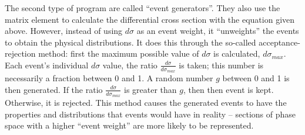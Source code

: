 The second type of program are called ``event generators''.  
They also use the matrix element to calculate 
the differential cross section %
with the equation given above.  
However, instead of using $d\sigma$ as an event weight, 
it ``unweights'' the events to obtain the physical 
distributions.  
It does this through the so-called acceptance-rejection method: 
first the maximum possible value of $d\sigma$ is calculated, 
$d\sigma_{max}$. 
Each event's individual $d\sigma$ value, 
the ratio $\frac{d\sigma}{d\sigma_{max}}$ is taken; 
this number is necessarily a fraction between 0 and 1.  
A random number $g$ between 0 and 1 is then generated.  
If the ratio $\frac{d\sigma}{d\sigma_{max}}$ is greater 
than $g$, then then event is kept.  
Otherwise, it is rejected.  
This method causes the generated events to have the properties 
and distributions that events would have in reality -- 
sections of phase space with a higher ``event weight'' 
are more likely to be represented.  




